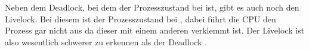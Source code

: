 Neben dem Deadlock, bei dem der Prozesszustand bei  ist, gibt es auch noch den Livelock. Bei diesem ist der Prozesszustand bei , dabei führt die CPU den Prozess gar nicht aus da dieser mit einem anderen verklemmt ist. Der Livelock ist also wesentlich schwerer zu erkennen als der Deadlock \parencite[vgl.][S. 561 f.]{tanenbaum2016}.